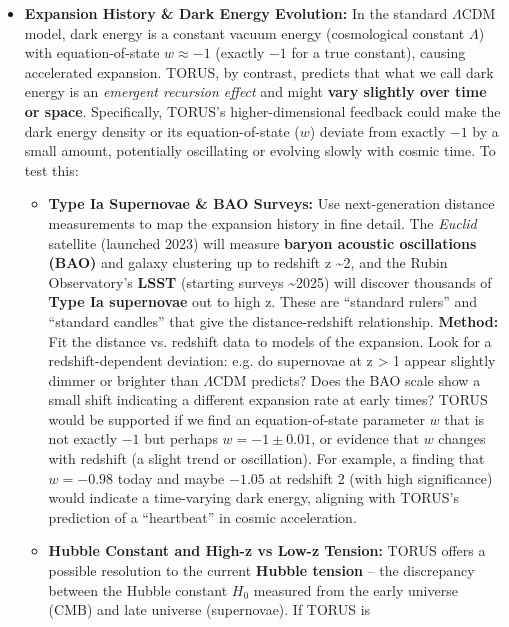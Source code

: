 \documentclass[]{article}
\newcommand{\subscript}[1]{\ensuremath{_{\mathrm{#1}}}}
\begin{document}
\begin{itemize}
\item
  \textbf{Expansion History \& Dark Energy Evolution:} In the standard
  $\Lambda$CDM model, dark energy is a constant vacuum energy (cosmological
  constant $\Lambda$) with equation-of-state $w \approx -1$ (exactly $-1$ for a true
  constant), causing accelerated expansion. TORUS, by contrast, predicts
  that what we call dark energy is an \emph{emergent recursion effect}
  and might \textbf{vary slightly over time or space}​. Specifically,
  TORUS's higher-dimensional feedback could make the dark energy density
  or its equation-of-state ($w$) deviate from exactly $-1$ by a small
  amount, potentially oscillating or evolving slowly with cosmic time​.
  To test this:

  \begin{itemize}
  \item
    \textbf{Type Ia Supernovae \& BAO Surveys:} Use next-generation
    distance measurements to map the expansion history in fine detail.
    The \emph{Euclid} satellite (launched 2023) will measure
    \textbf{baryon acoustic oscillations (BAO)} and galaxy clustering up
    to redshift z \textasciitilde{}2, and the Rubin Observatory's
    \textbf{LSST} (starting surveys \textasciitilde{}2025) will discover
    thousands of \textbf{Type Ia supernovae} out to high z. These are
    ``standard rulers'' and ``standard candles'' that give the
    distance-redshift relationship. \textbf{Method:} Fit the distance
    vs. redshift data to models of the expansion. Look for a
    redshift-dependent deviation: e.g. do supernovae at z \textgreater{}
    1 appear slightly dimmer or brighter than $\Lambda$CDM predicts? Does the
    BAO scale show a small shift indicating a different expansion rate
    at early times? TORUS would be supported if we find an
    equation-of-state parameter $w$ that is not exactly $-1$ but perhaps
    $w = -1 \pm 0.01$, or evidence that $w$ changes with redshift (a slight
    trend or oscillation)​. For example, a finding that $w = -0.98$ today
    and maybe $-1.05$ at redshift 2 (with high significance) would
    indicate a time-varying dark energy, aligning with TORUS's
    prediction of a ``heartbeat'' in cosmic acceleration​.
  \item
    \textbf{Hubble Constant and High-z vs Low-z Tension:} TORUS offers a
    possible resolution to the current \textbf{Hubble tension} -- the
    discrepancy between the Hubble constant $H\subscript{0}$ measured from the
    early universe (CMB) and late universe (supernovae)​. If TORUS is

\end{itemize}
\end{itemize}
\end{document}
